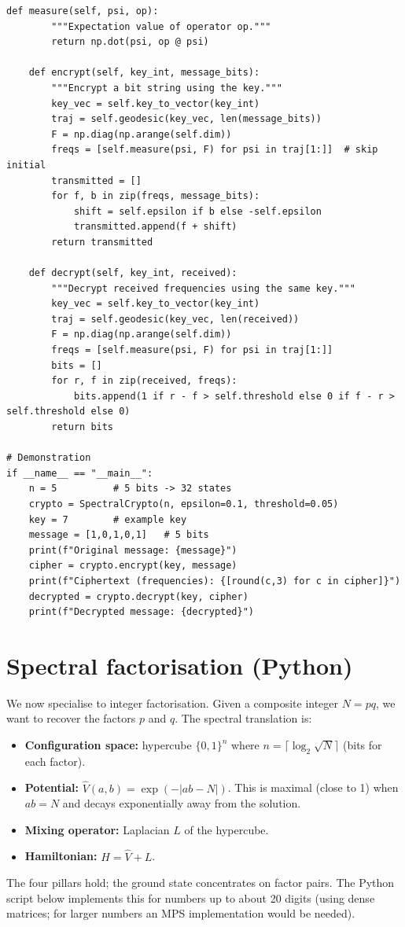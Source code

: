 \documentclass[11pt,a4paper]{article}
\begin{document}
\begin{lstlisting}[style=python, caption={SpectralCrypto.py}]
    def measure(self, psi, op):
        """Expectation value of operator op."""
        return np.dot(psi, op @ psi)

    def encrypt(self, key_int, message_bits):
        """Encrypt a bit string using the key."""
        key_vec = self.key_to_vector(key_int)
        traj = self.geodesic(key_vec, len(message_bits))
        F = np.diag(np.arange(self.dim))
        freqs = [self.measure(psi, F) for psi in traj[1:]]  # skip initial
        transmitted = []
        for f, b in zip(freqs, message_bits):
            shift = self.epsilon if b else -self.epsilon
            transmitted.append(f + shift)
        return transmitted

    def decrypt(self, key_int, received):
        """Decrypt received frequencies using the same key."""
        key_vec = self.key_to_vector(key_int)
        traj = self.geodesic(key_vec, len(received))
        F = np.diag(np.arange(self.dim))
        freqs = [self.measure(psi, F) for psi in traj[1:]]
        bits = []
        for r, f in zip(received, freqs):
            bits.append(1 if r - f > self.threshold else 0 if f - r > self.threshold else 0)
        return bits

# Demonstration
if __name__ == "__main__":
    n = 5          # 5 bits -> 32 states
    crypto = SpectralCrypto(n, epsilon=0.1, threshold=0.05)
    key = 7        # example key
    message = [1,0,1,0,1]   # 5 bits
    print(f"Original message: {message}")
    cipher = crypto.encrypt(key, message)
    print(f"Ciphertext (frequencies): {[round(c,3) for c in cipher]}")
    decrypted = crypto.decrypt(key, cipher)
    print(f"Decrypted message: {decrypted}")
\end{lstlisting}

\section{Spectral factorisation (Python)}

We now specialise to integer factorisation. Given a composite integer \(N = pq\), we want to recover the factors \(p\) and \(q\). The spectral translation is:

\begin{itemize}
\item \textbf{Configuration space:} hypercube \(\{0,1\}^n\) where \(n = \lceil \log_2 \sqrt{N} \rceil\) (bits for each factor).
\item \textbf{Potential:} \(\hat{V}(a,b) = \exp(-|a b - N|)\). This is maximal (close to 1) when \(ab = N\) and decays exponentially away from the solution.
\item \textbf{Mixing operator:} Laplacian \(L\) of the hypercube.
\item \textbf{Hamiltonian:} \(H = \hat{V} + L\).
\end{itemize}
The four pillars hold; the ground state concentrates on factor pairs. The Python script below implements this for numbers up to about 20 digits (using dense matrices; for larger numbers an MPS implementation would be needed).
\end{document}
